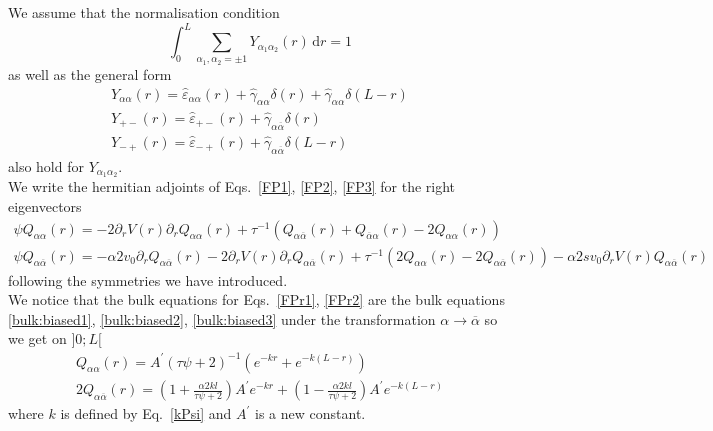 \documentclass[pre,aps,superscriptaddress,nofootinbib]{revtex4}
\begin{document}
We assume that the normalisation condition
\begin{equation}
\int_0^L \sum_{\alpha_1, \alpha_2 = \pm 1} Y_{\alpha_1\alpha_2}(r) \, \mathrm{d}r = 1
\label{normalisation_pave}
\end{equation}
as well as the general form
\begin{eqnarray}
\label{gfY1}
Y_{\alpha\alpha}(r) = \hat{\varepsilon}_{\alpha\alpha}(r) + \hat{\gamma}_{\alpha\alpha} \delta (r) +  \hat{\gamma}_{\alpha\alpha} \delta (L - r)\\
\label{gfY2}
Y_{+-}(r) = \hat{\varepsilon}_{+-}(r) + \hat{\gamma}_{\alpha\overline{\alpha}} \delta (r)\\
\label{gfY3}
Y_{-+}(r) = \hat{\varepsilon}_{-+}(r) + \hat{\gamma}_{\alpha\overline{\alpha}} \delta (L - r)
\end{eqnarray}
also hold for $Y_{\alpha_1\alpha_2}$.\\

We write the hermitian adjoints of Eqs.~\ref{FP1}, \ref{FP2}, \ref{FP3} for the right eigenvectors
\begin{eqnarray}
\label{FPr1}
\psi Q_{\alpha\alpha}(r) = -2 \partial_r V(r) \partial_r Q_{\alpha\alpha}(r) + \tau^{-1} (Q_{\alpha\overline{\alpha}}(r) + Q_{\overline{\alpha}\alpha}(r) - 2 Q_{\alpha\alpha}(r))\\
\label{FPr2}
\psi Q_{\alpha\overline{\alpha}}(r) = - \alpha 2 v_0 \partial_r Q_{\alpha\overline{\alpha}}(r) - 2 \partial_r V(r) \partial_r Q_{\alpha\overline{\alpha}}(r) + \tau^{-1} (2 Q_{\alpha\alpha}(r) - 2 Q_{\alpha\overline{\alpha}}(r)) - \alpha 2 s v_0 \partial_r V(r) Q_{\alpha\overline{\alpha}}(r)
\end{eqnarray}
following the symmetries we have introduced.\\

We notice that the bulk equations for Eqs.~\ref{FPr1}, \ref{FPr2} are the bulk equations \eqref{bulk:biased1}, \eqref{bulk:biased2}, \eqref{bulk:biased3} under the transformation $\alpha \to \overline{\alpha}$ so we get on $]0;L[$
\begin{eqnarray}
\label{qaa}
Q_{\alpha\alpha}(r) = A^{\prime} (\tau \psi + 2)^{-1} (e^{-k r} + e^{-k (L - r)})\\
\label{qaoa}
2 Q_{\alpha\overline{\alpha}}(r) = \left(1 + \frac{\alpha 2 k l}{\tau \psi + 2}\right) A^{\prime} e^{- k r} + \left(1 - \frac{\alpha 2 k l}{\tau \psi + 2}\right) A^{\prime} e^{- k (L - r)}
\end{eqnarray}
where $k$ is defined by Eq.~\ref{kPsi} and $A^{\prime}$ is a new constant.
\end{document}
